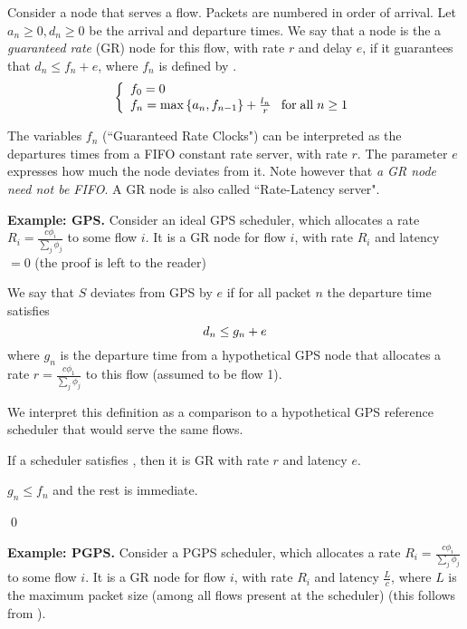 \begin{definition}
Consider a node that serves a flow. Packets are numbered in order
of arrival. Let $a_n \geq 0, d_n \geq 0$ be the arrival and
departure times. We say that a node is the a \emph{guaranteed
rate} (GR) node for this flow, with rate $r$ and delay $e$, if it
guarantees that $d_n \leq f_n + e$, where $f_n$ is defined by
.
\begin{equation}\mylabel{eq-gr-def}
\bracket{ f_0=0\\
    f_n= \max \left\{
                   a_n, f_{n-1}
                 \right\}
             + \frac{l_n}{r} \gap \mfa n \geq 1
            }
\end{equation}
\end{definition}
%
The variables $f_n$ (``Guaranteed Rate Clocks") can be interpreted
as the departures times from a FIFO constant rate server, with
rate $r$. The parameter $e$ expresses how much the node deviates
from it. Note however that \emph{a GR node need not be FIFO}. A GR
node is also called ``Rate-Latency server".

\textbf{Example: GPS.} Consider an ideal GPS scheduler, which
allocates a rate $R_i=\frac{c \phi_i}{\sum_j \phi_j}$ to some flow
$i$. It is a GR node for flow $i$, with rate $R_i$ and latency
$=0$ (the proof is left to the reader)

\begin{definition}
We say that $S$ deviates from GPS by $e$ if for all packet $n$
the departure time satisfies
\begin{equation}\mylabel{eq-gr-eq6}
d_n\leq g_n + e
\end{equation}
where $g_n$ is the departure time from a hypothetical GPS node
that allocates a rate $r=\frac{c \phi_1}{\sum_j \phi_j}$ to
this flow (assumed to be flow 1).
\end{definition}

We interpret this definition as a comparison to a hypothetical
GPS reference scheduler that would serve the same flows.
\begin{theorem}
\label{theo-grgps} If a scheduler satisfies ,
then it is GR with rate $r$ and latency $e$.
\end{theorem}
\pr
$g_n \leq f_n$ and the rest is immediate.

\qed

\textbf{Example: PGPS.} Consider a PGPS scheduler, which allocates
a rate $R_i=\frac{c \phi_i}{\sum_j \phi_j}$ to some flow $i$. It
is a GR node for flow $i$, with rate $R_i$ and latency
$\frac{L}{c}$, where $L$ is the maximum packet size (among all
flows present at the scheduler) (this follows from
).



